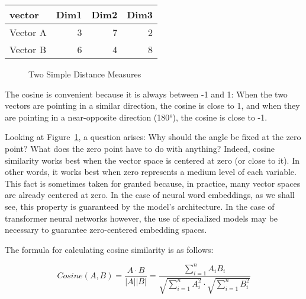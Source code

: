\documentclass[
  man,
  floatsintext,
  longtable,
  nolmodern,
  notxfonts,
  notimes,
  colorlinks=true,linkcolor=blue,citecolor=blue,urlcolor=blue]{apa7}
\begin{document}
\begin{table}

{\caption{{Example Three-Dimensional Vectors}{\label{tbl-example_vecs}}}
\vspace{-20pt}}

\begin{longtable}[]{@{}lrrr@{}}
\toprule\noalign{}
vector & Dim1 & Dim2 & Dim3 \\
\midrule\noalign{}
\endhead
\bottomrule\noalign{}
\endlastfoot
Vector A & 3 & 7 & 2 \\
Vector B & 6 & 4 & 8 \\
\end{longtable}

\end{table}

\begin{figure}

\caption{\label{fig-distmeasures}Two Simple Distance Measures}


\end{figure}%

The cosine is convenient because it is always between -1 and 1: When the
two vectors are pointing in a similar direction, the cosine is close to
1, and when they are pointing in a near-opposite direction (180°), the
cosine is close to -1.

Looking at Figure~\ref{fig-distmeasures}, a question arises: Why should
the angle be fixed at the zero point? What does the zero point have to
do with anything? Indeed, cosine similarity works best when the vector
space is centered at zero (or close to it). In other words, it works
best when zero represents a medium level of each variable. This fact is
sometimes taken for granted because, in practice, many vector spaces are
already centered at zero. In the case of neural word embeddings, as we
shall see, this property is guaranteed by the model's architecture. In
the case of transformer neural networks however, the use of specialized
models may be necessary to guarantee zero-centered embedding spaces.

The formula for calculating cosine similarity is as follows:

\[
Cosine(A,B) = \frac{A \cdot B}{|A||B|} = \frac{\sum _{i=1}^{n}  A_{i}B_{i}}{\sqrt {\sum _{i=1}^{n} A_{i}^2} \cdot \sqrt {\sum _{i=1}^{n} B_{i}^2}}
\]
\end{document}

